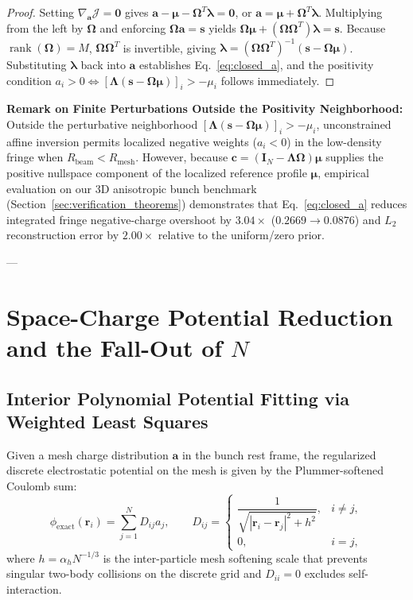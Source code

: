 \documentclass[11pt,a4paper]{article}
\newcommand{\bOmega}{\mathbf{\Omega}}
\newcommand{\bLambda}{\mathbf{\Lambda}}
\begin{document}
\begin{proof}
Setting $\nabla_{\bm{a}} \mathcal{J} = \bm{0}$ gives $\bm{a} - \bm{\mu} - \bOmega^T \bm{\lambda} = \bm{0}$, or $\bm{a} = \bm{\mu} + \bOmega^T \bm{\lambda}$. Multiplying from the left by $\bOmega$ and enforcing $\bOmega\bm{a} = \bm{s}$ yields $\bOmega\bm{\mu} + (\bOmega\bOmega^T)\bm{\lambda} = \bm{s}$. Because $\operatorname{rank}(\bOmega) = M$, $\bOmega\bOmega^T$ is invertible, giving $\bm{\lambda} = (\bOmega\bOmega^T)^{-1}(\bm{s} - \bOmega\bm{\mu})$. Substituting $\bm{\lambda}$ back into $\bm{a}$ establishes Eq.~\eqref{eq:closed_a}, and the positivity condition $a_i > 0 \iff [\bLambda(\bm{s} - \bOmega\bm{\mu})]_i > -\mu_i$ follows immediately.
\end{proof}

\noindent\textbf{Remark on Finite Perturbations Outside the Positivity Neighborhood:}
Outside the perturbative neighborhood $[\bLambda(\bm{s} - \bOmega\bm{\mu})]_i > -\mu_i$, unconstrained affine inversion permits localized negative weights ($a_i < 0$) in the low-density fringe when $R_{\mathrm{beam}} < R_{\mathrm{mesh}}$. However, because $\bm{c} = (\bm{I}_N - \bLambda\bOmega)\bm{\mu}$ supplies the positive nullspace component of the localized reference profile $\bm{\mu}$, empirical evaluation on our 3D anisotropic bunch benchmark (Section~\ref{sec:verification_theorems}) demonstrates that Eq.~\eqref{eq:closed_a} reduces integrated fringe negative-charge overshoot by $3.04\times$ ($0.2669 \to 0.0876$) and $L_2$ reconstruction error by $2.00\times$ relative to the uniform/zero prior.

---

\section{Space-Charge Potential Reduction and the Fall-Out of \texorpdfstring{$N$}{N}}

\subsection{Interior Polynomial Potential Fitting via Weighted Least Squares}
Given a mesh charge distribution $\bm{a}$ in the bunch rest frame, the regularized discrete electrostatic potential on the mesh is given by the Plummer-softened Coulomb sum:
\begin{equation}
    \phi_{\mathrm{exact}}(\bm{r}_i) = \sum_{j=1}^N D_{ij} a_j, \qquad D_{ij} = \begin{cases} \dfrac{1}{\sqrt{|\bm{r}_i - \bm{r}_j|^2 + h^2}}, & i \ne j, \\[8pt] 0, & i = j, \end{cases}
    \label{eq:phi_exact}
\end{equation}
where $h = \alpha_h N^{-1/3}$ is the inter-particle mesh softening scale that prevents singular two-body collisions on the discrete grid and $D_{ii} = 0$ excludes self-interaction.
\end{document}
